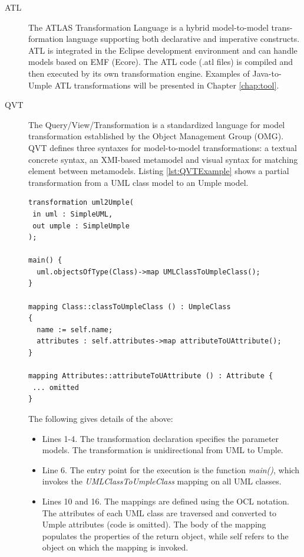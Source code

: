 \begin{description}
\item[ATL]
The ATLAS Transformation Language \cite{atl} is a hybrid model-to-model trans-formation language supporting both declarative and imperative constructs. ATL is integrated in the Eclipse development environment and can handle models based on EMF (Ecore). The ATL code (.atl files) is compiled and then executed by its own transformation engine. Examples of Java-to-Umple ATL transformations will be presented in Chapter \ref{chap:tool}.

\item[QVT]
The Query/View/Transformation \cite{QVTMain} is a standardized language for model transformation established by the Object Management Group (OMG). QVT defines three syntaxes for model-to-model transformations: a textual concrete syntax, an XMI-based metamodel and visual syntax for matching element between metamodels.
Listing \ref{lst:QVTExample} shows a partial transformation from a UML class model to an Umple model.

\begin{lstlisting}[style=java,label=lst:QVTExample, caption=A basic QVT transformation]
transformation uml2Umple(
 in uml : SimpleUML,
 out umple : SimpleUmple
);

main() {
  uml.objectsOfType(Class)->map UMLClassToUmpleClass();
}

mapping Class::classToUmpleClass () : UmpleClass
{
  name := self.name;
  attributes : self.attributes->map attributeToUAttribute();
}

mapping Attributes::attributeToUAttribute () : Attribute {
 ... omitted
}
\end{lstlisting}

The following gives details of the above:

\begin{itemize}

\item Lines 1-4. The transformation declaration specifies the parameter models. The transformation is unidirectional from UML to Umple.

\item Line 6. The entry point for the execution is the function \textit{main()}, which invokes the \textit{UMLClassToUmpleClass} mapping on all UML classes. 

\item Lines 10 and 16. The mappings are defined using the OCL notation. The attributes of each UML class are traversed and converted to Umple attributes (code is omitted). The body of the mapping populates the properties of the return object, while self refers to the object on which the mapping is invoked.
\end{itemize}


\end{description}
